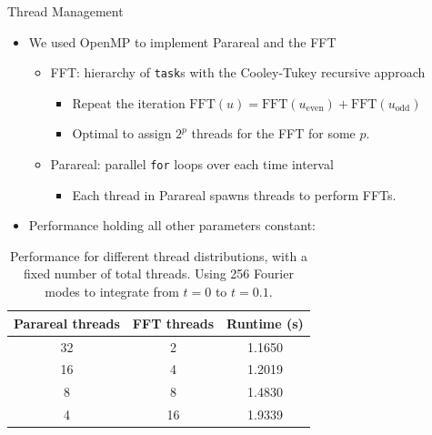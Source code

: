 \documentclass{beamer}
\begin{document}
\begin{frame}{Thread Management} %

\begin{itemize}
  \item We used OpenMP to implement Parareal and the FFT
  \begin{itemize}
      \item FFT: hierarchy of \texttt{task}s with the Cooley-Tukey recursive approach
      \begin{itemize}
          \item Repeat the iteration $\text{FFT}(u) = \text{FFT}(u_{\text{even}}) 
          + \text{FFT}(u_{\text{odd}})$
          \item Optimal to assign $2^p$ threads for the FFT for some $p$.
      \end{itemize}
      \item Parareal: parallel \texttt{for} loops over each time interval
      \begin{itemize}
          \item Each thread in Parareal spawns threads to perform FFTs.
      \end{itemize}
  \end{itemize}
  
  \pause
  
  \item Performance holding all other parameters constant:
\end{itemize}

\begin{table}[h!]
    \centering
    \begin{tabular}{|c|c|c|}
    \hline
    Parareal threads & FFT threads & Runtime (s) \\
    \hline\hline
    32 & 2 & 1.1650 \\
    16 & 4 & 1.2019 \\
    8 & 8  & 1.4830 \\
    4 & 16 & 1.9339 \\
    \hline
    \end{tabular}
    \caption{Performance for different thread distributions,
    with a fixed number of total threads. Using 256 Fourier modes
    to integrate from $t=0$ to $t=0.1$.}
    \label{tab:thread_dist}
\end{table}
\end{frame}
\end{document}
